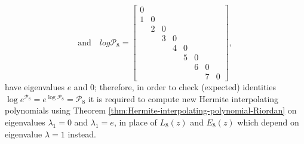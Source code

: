 \begin{example}
\begin{displaymath}
\end{displaymath}
\begin{displaymath}
\text{and}\quad log{\mathcal{P}_{8}} = \left[\begin{matrix} 0 &   &   &   &   &   &   &  \\1 & 0   &   &   &   &   &   &  \\  & 2 &  0  &   &   &   &   &  \\  &   & 3 &  0  &   &   &   &  \\  &   &   & 4 &  0  &   &   &  \\  &   &   &   & 5 &  0  &   &  \\  &   &   &   &   & 6 &  0  &  \\  &   &   &   &   &   & 7 &  0 \end{matrix}\right],
\end{displaymath}
have eigenvalues $e$ and $0$; therefore, in order to check (expected)
identities $\log{e^{\mathcal{P}_{8}}} = e^{\log{\mathcal{P}_{8}}} =
\mathcal{P}_{8}$ it is required to compute new Hermite interpolating
polynomials  using Theorem \ref{thm:Hermite-interpolating-polynomial-Riordan} on
eigenvalues $\lambda_{1}=0$ and $\lambda_{1}=e$, in place of $L_{8}(z)$ and
$E_{8}(z)$ which depend on eigenvalue $\lambda=1$ instead.
\end{example}
